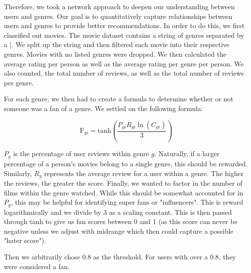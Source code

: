 \documentclass[12pt]{article}
\numberwithin{equation}{section}
\begin{document}
Therefore, we took a network approach to deepen our understanding between users and genres. Our goal is to quantitatively capture relationships between users and genres to provide better recommendations. In order to do this, we first classified out movies. The movie dataset contains a string of genres separated by a |. We split up the string and then filtered each movie into their respective genres. Movies with no listed genres were dropped. We then calculated the average rating per person as well as the average rating per genre per person. We also counted, the total number of reviews, as well as the total number of reviews per genre. 

For each genre, we then had to create a formula to determine whether or not someone was a fan of a genre. We settled on the following formula:

\[
\text{F}_{gi}= \text{tanh}\left(\frac{P_{gi} R_{gi}\ln(C_{gi})}{3}\right)
\]

$P_g$ is the percentage of user reviews within genre $g$. Naturally, if a larger percentage of a person's movies belong to a single genre, this should be rewarded. Similarly, $R_g$ represents the average review for a user within a genre. The higher the reviews, the greater the score. Finally, we wanted to factor in the number of films within the genre watched. While this should be somewhat accounted for in $P_g$, this may be helpful for identifying super fans or "influencers". This is reward logarithmically and we divide by 3 as a scaling constant.
This is then passed through tanh to give us fan scores between 0 and 1 (as this score can never be negative unless we adjust with midrange which then could capture a possible "hater score").

Then we arbitrarily chose 0.8 as the threshold. For users with over a 0.8, they were considered a fan. 
\end{document}

